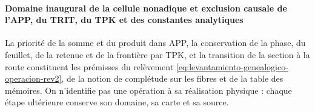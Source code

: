 \paragraph{Domaine inaugural de la cellule nonadique et exclusion causale de l’APP, du TRIT, du TPK et des constantes analytiques}
La priorité de la somme et du produit dans APP, la conservation de la phase, du feuillet,
de la retenue et de la frontière par TPK, et la transition de la section à la route constituent les
prémisses du relèvement
\eqref{eq:levantamiento-genealogico-operacion-rev2}, de la notion de complétude
sur les fibres et de la table des mémoires. On n'identifie pas une opération à sa réalisation physique :
chaque étape ultérieure conserve son domaine, sa carte et sa source.
